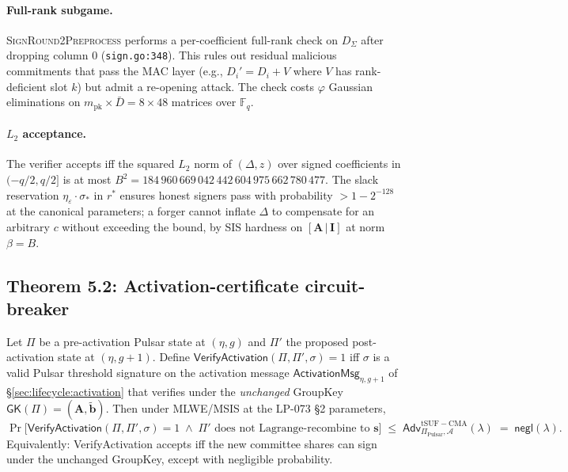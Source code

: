 \paragraph{Full-rank subgame.} \textsc{SignRound2Preprocess} performs a
per-coefficient full-rank check on $D_\Sigma$ after dropping column 0
(\texttt{sign.go:348}). This rules out residual malicious commitments
that pass the MAC layer (e.g., $D_i' = D_i + V$ where $V$ has
rank-deficient slot $k$) but admit a re-opening attack. The check costs
$\varphi$ Gaussian eliminations on $m_{\mathrm{pk}} \times \bar D = 8
\times 48$ matrices over $\mathbb{F}_q$.

\paragraph{$L_2$ acceptance.} The verifier accepts iff the squared
$L_2$ norm of $(\Delta, z)$ over signed coefficients in $(-q/2, q/2]$
is at most $B^2 = 184\,960\,669\,042\,442\,604\,975\,662\,780\,477$.
The slack reservation $\eta_\varepsilon \cdot \sigma_*$ in $r^*$
ensures honest signers pass with probability $> 1 - 2^{-128}$ at the
canonical parameters; a forger cannot inflate $\Delta$ to compensate
for an arbitrary $c$ without exceeding the bound, by SIS hardness on
$[\mathbf{A}\,|\,\mathbf{I}]$ at norm $\beta = B$.

\subsection{Theorem 5.2: Activation-certificate circuit-breaker}
\label{sec:security:thm52}

\begin{theorem}
\label{thm:pulsar-activation}
Let $\Pi$ be a pre-activation Pulsar state at $(\eta, g)$ and $\Pi'$
the proposed post-activation state at $(\eta, g+1)$. Define
$\mathsf{VerifyActivation}(\Pi, \Pi', \sigma) = 1$ iff $\sigma$ is a
valid Pulsar threshold signature on the activation message
$\mathsf{ActivationMsg}_{\eta, g+1}$ of \S\ref{sec:lifecycle:activation}
that verifies under the \emph{unchanged} GroupKey
$\mathsf{GK}(\Pi) = (\mathbf{A}, \tilde{\mathbf{b}})$. Then under
MLWE/MSIS at the LP-073 \S2 parameters,
\[
  \Pr\bigl[
    \mathsf{VerifyActivation}(\Pi, \Pi', \sigma) = 1
    \;\wedge\;
    \Pi' \text{ does not Lagrange-recombine to } \mathbf{s}
  \bigr]
  \;\leq\;
  \mathsf{Adv}^{\mathrm{tSUF-CMA}}_{\Pi_{\mathrm{Pulsar}}, \mathcal{A}}(\lambda)
  \;=\; \mathsf{negl}(\lambda).
\]
Equivalently: \textsf{VerifyActivation} accepts iff the new committee
shares can sign under the unchanged GroupKey, except with negligible
probability.
\end{theorem}

